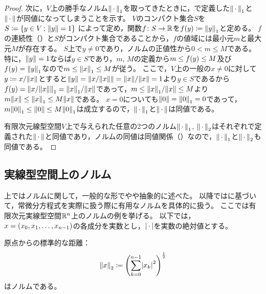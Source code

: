 \documentclass[b5paper,draft,oneside,openany]{ltjsbook} %
\begin{document}
\begin{thm}
\begin{proof}
        次に，$V$上の勝手なノルム$\norm{\dummy}_1$を取ってきたときに，で定義した$\norm{\dummy}_1$と$\norm{\dummy}$が同値になってしまうことを示す。
        $V$のコンパクト集合$S$を$S\coloneqq \sset{y\in V}{\norm{y}=1}$
        によって定め，関数$f\colon S\to \mathbb{R}$を$\fun{f}{y}\coloneqq \norm{y}_1$と定める。
        $f$の連続性（）と$S$がコンパクト集合であることから，$f$の値域には最小元$m$と最大元$M$が存在する。
        $S$上で$y\ne {0}$であり，ノルムの正値性から$0<m\leq M$である。
        特に，$\norm{y}=1$ならば$y\in S$であり，$m$, $M$の定義から$m\leq \fun{f}{y}\leq M$及び$\fun{f}{y}=\norm{y}_1$なので$m\leq \norm{x}_1\leq M$が従う。
        ここで，$V$上の一般の$x\ne 0$に対して$y\coloneqq x / \norm{x}$とすると$\norm{y}=\norm{x/\norm{x}}=\norm{x}/\norm{x}=1$より$y\in S$であるから$\fun{f}{y}=\norm{x/\norm{x}}_1=\norm{x}_1/\norm{x}$であって，$m\leq \norm{x}_1/\norm{x}\leq M$より$m\norm{x}\leq \norm{x}_1\leq M\norm{x}$である。
        $x=0$についても$\norm{0}=\norm{0}_1=0$であって，$m \norm{0}_1\leq \norm{0}\leq M\norm{0}_1$は成立するので，$\norm{\dummy}_1$と$\norm{\dummy}$は同値である。

        有限次元線型空間$V$上で与えられた任意の2つのノルム$\norm{\dummy}_1$, $\norm{\dummy}_2$はそれぞれで定義された$\norm{\dummy}$と同値であり，ノルムの同値は同値関係（）なので，$\norm{\dummy}_1$と$\norm{\dummy}_2$も同値である。
    \end{proof}
\end{thm}


\subsection{実線型空間上のノルム}
上ではノルムに関して，一般的な形でやや抽象的に述べた。
以降では\cite{takano}に基づいて，常微分方程式を実際に扱う際に有用なノルムを具体的に扱う。
ここでは有限次元実線型空間$\mathbb{R}^n$上のノルムの例を挙げる。
以下では，$x=\pare{x_0,x_1,\dots,x_{n-1}}$の各成分を実数とし，$\abs{\dummy}$を実数の絶対値とする。

\begin{eg}[Euclidノルム]
    原点からの標準的な距離：
    \begin{equation}
        \norm{x}_2\coloneqq \pare{\sum_{k=0}^{n-1} \abs{x_k}^2}^{\frac{1}{2}}
    \end{equation}
    はノルムである。
\end{eg}
\end{document}
